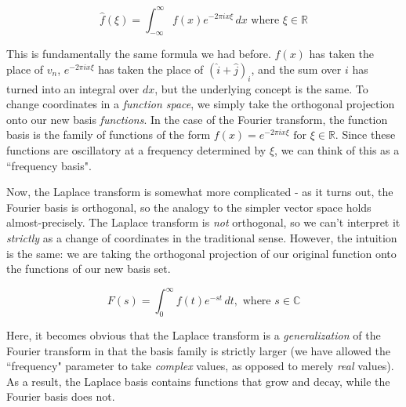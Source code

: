 \begin{equation*}
  \hat{f}(\xi) = \int_{-\infty}^\infty f(x) e^{-2\pi ix \xi} \,dx
    \text{ where } \xi \in \mathbb{R}
\end{equation*}

This is fundamentally the same formula we had before. $f(x)$ has taken the place
of $v_n$, $e^{-2\pi ix \xi}$ has taken the place of $(\hat{i} + \hat{j})_i$, and
the sum over $i$ has turned into an integral over $dx$, but the underlying
concept is the same. To change coordinates in a \textit{function space}, we
simply take the orthogonal projection onto our new basis \textit{functions}. In
the case of the Fourier transform, the function basis is the family of functions
of the form $f(x) = e^{-2\pi ix \xi} \text{ for } \xi \in \mathbb{R}$. Since
these functions are oscillatory at a frequency determined by $\xi$, we can think
of this as a ``frequency basis".

Now, the Laplace transform is somewhat more complicated - as it turns out, the
Fourier basis is orthogonal, so the analogy to the simpler vector space holds
almost-precisely. The Laplace transform is \textit{not} orthogonal, so we can't
interpret it \textit{strictly} as a change of coordinates in the traditional
sense. However, the intuition is the same: we are taking the orthogonal
projection of our original function onto the functions of our new basis set.

\begin{equation*}
  F(s) = \int_0^\infty f(t) e^{-st} \,dt, \text{ where } s \in \mathbb{C}
\end{equation*}

Here, it becomes obvious that the Laplace transform is a \textit{generalization}
of the Fourier transform in that the basis family is strictly larger (we have
allowed the ``frequency" parameter to take \textit{complex} values, as opposed
to merely \textit{real} values). As a result, the Laplace basis contains
functions that grow and decay, while the Fourier basis does not.

